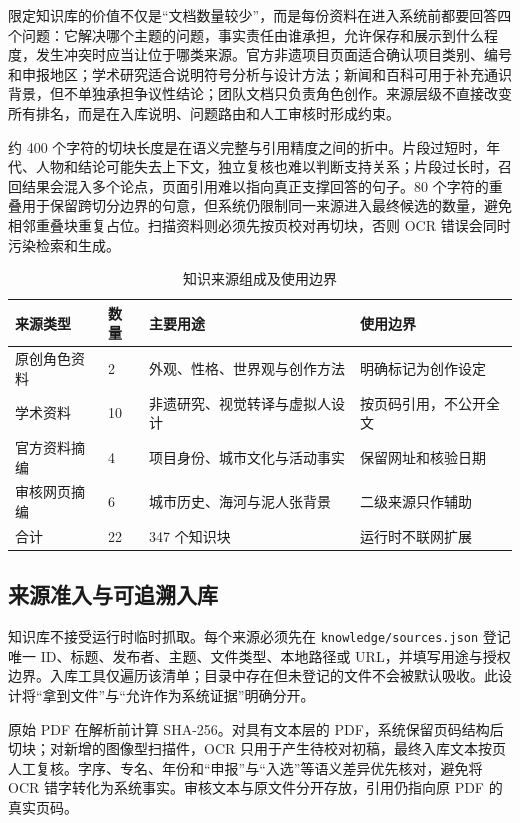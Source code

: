 \documentclass[UTF8,zihao=-4,fontset=none,twoside]{ctexart}
\newcommand{\code}[1]{\mbox{\texttt{#1}}\nobreak}
\begin{document}
限定知识库的价值不仅是“文档数量较少”，而是每份资料在进入系统前都要回答四个问题：它解决哪个主题的问题，事实责任由谁承担，允许保存和展示到什么程度，发生冲突时应当让位于哪类来源。官方非遗项目页面适合确认项目类别、编号和申报地区；学术研究适合说明符号分析与设计方法；新闻和百科可用于补充通识背景，但不单独承担争议性结论；团队文档只负责角色创作。来源层级不直接改变所有排名，而是在入库说明、问题路由和人工审核时形成约束。

约 400 个字符的切块长度是在语义完整与引用精度之间的折中。片段过短时，年代、人物和结论可能失去上下文，独立复核也难以判断支持关系；片段过长时，召回结果会混入多个论点，页面引用难以指向真正支撑回答的句子。80 个字符的重叠用于保留跨切分边界的句意，但系统仍限制同一来源进入最终候选的数量，避免相邻重叠块重复占位。扫描资料则必须先按页校对再切块，否则 OCR 错误会同时污染检索和生成。

\begin{table}[htbp]
\centering
\caption{知识来源组成及使用边界}
\label{tab:corpus}
\begin{tabularx}{\linewidth}{@{}p{31mm}C{15mm}Y Y@{}}
\toprule
来源类型 & 数量 & 主要用途 & 使用边界 \\
\midrule
原创角色资料 & 2 & 外观、性格、世界观与创作方法 & 明确标记为创作设定 \\
学术资料 & 10 & 非遗研究、视觉转译与虚拟人设计 & 按页码引用，不公开全文 \\
官方资料摘编 & 4 & 项目身份、城市文化与活动事实 & 保留网址和核验日期 \\
审核网页摘编 & 6 & 城市历史、海河与泥人张背景 & 二级来源只作辅助 \\
\midrule
合计 & 22 & 347 个知识块 & 运行时不联网扩展 \\
\bottomrule
\end{tabularx}
\end{table}

\subsection{来源准入与可追溯入库}

知识库不接受运行时临时抓取。每个来源必须先在 \code{knowledge/sources.json} 登记唯一 ID、标题、发布者、主题、文件类型、本地路径或 URL，并填写用途与授权边界。入库工具仅遍历该清单；目录中存在但未登记的文件不会被默认吸收。此设计将“拿到文件”与“允许作为系统证据”明确分开。

原始 PDF 在解析前计算 SHA-256。对具有文本层的 PDF，系统保留页码结构后切块；对新增的图像型扫描件，OCR 只用于产生待校对初稿，最终入库文本按页人工复核。字序、专名、年份和“申报”与“入选”等语义差异优先核对，避免将 OCR 错字转化为系统事实。审核文本与原文件分开存放，引用仍指向原 PDF 的真实页码。
\end{document}
